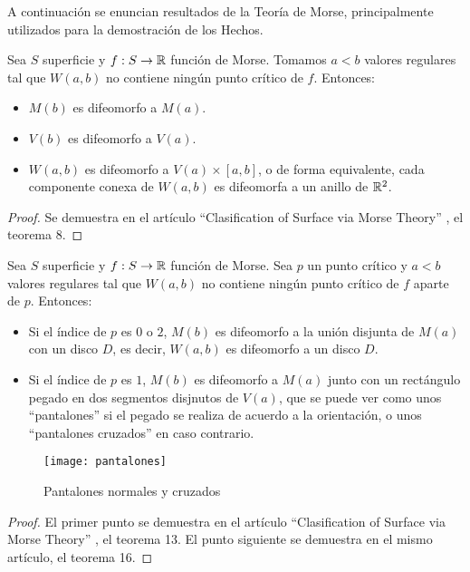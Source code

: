 
A continuación se enuncian resultados de la Teoría de Morse, principalmente utilizados para la demostración de los Hechos.

\begin{teorema}
	Sea $S$ superficie y $f: S \rightarrow \mathbb{R}$ función de Morse. Tomamos $a < b$ valores regulares tal que $W(a,b)$ no contiene ningún punto crítico de $f$. Entonces:
	\begin{itemize}
		\item $M(b)$ es difeomorfo a $M(a)$.
		\item $V(b)$ es difeomorfo a $V(a)$.
		\item $W(a,b)$ es difeomorfo a $V(a) \times [a,b]$, o de forma equivalente, cada componente conexa de $W(a,b)$ es difeomorfa a un anillo de $\mathbb{R}^2$.
	\end{itemize}
\end{teorema}

\begin{proof}
	Se demuestra en el artículo ``Clasification of Surface via Morse Theory'' \cite{MorseTh1}, el teorema 8.
\end{proof}

\begin{teorema}
	Sea $S$ superficie y $f: S \rightarrow \mathbb{R}$ función de Morse. Sea $p$ un punto crítico y $a < b$ valores regulares tal que $W(a,b)$ no contiene ningún punto crítico de $f$ aparte de $p$. Entonces:
	\begin{itemize}
		\item Si el índice de $p$ es $0$ o $2$, $M(b)$ es difeomorfo a la unión disjunta de $M(a)$ con un disco $D$, es decir, $W(a,b)$ es difeomorfo a un disco $D$.
		\item Si el índice de $p$ es $1$, $M(b)$ es difeomorfo a $M(a)$ junto con un rectángulo pegado  en dos segmentos disjnutos de $V(a)$, que se puede ver como unos ``pantalones'' si el pegado se realiza de acuerdo a la orientación, o unos ``pantalones cruzados'' en caso contrario.
	\end{itemize}
\end{teorema}

\begin{figure}[h]
  	\centering
  	\texttt{[image: pantalones]}
  	\caption{Pantalones normales y cruzados}
  	\label{fig:pantalones}
\end{figure}

\begin{proof}
	El primer punto se demuestra en el artículo ``Clasification of Surface via Morse Theory'' \cite{MorseTh1}, el teorema 13. El punto siguiente se demuestra en el mismo artículo, el teorema 16.
\end{proof}

\endinput
